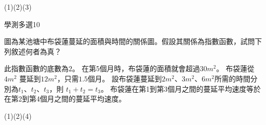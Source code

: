 \begin{QUESTIONS}
\begin{QUESTION}
        \begin{QFROMS}
        \end{QFROMS}
        \begin{QTAGS}\end{QTAGS}
        \begin{QANS}
            (1)(2)(3)
        \end{QANS}
        \begin{QSOLLIST}
        \end{QSOLLIST}
        \begin{QEMPTYSPACE}
        \end{QEMPTYSPACE}
    \end{QUESTION}
    \begin{QUESTION}
        \begin{ExamInfo}{87}{學測}{多選}{10}
        \end{ExamInfo}
        \begin{ExamAnsRateInfo}{}{}{}{}
        \end{ExamAnsRateInfo}
        \begin{QBODY}
            圖為某池塘中布袋蓮蔓延的面積與時間的關係圖。假設其關係為指數函數，試問下列敘述何者為真？
            \begin{QOPS}
                \QOP 此指數函數的底數為$2$。
                \QOP 在第5個月時，布袋蓮的面積就會超過$30m^2$。
                \QOP 布袋蓮從$4m^2$ 蔓延到$12m^2$，只需$1.5$個月。
                \QOP 設布袋蓮蔓延到$2m^2$、$3m^2$、$6m^2$所需的時間分別為$t_1$、$t_2$、$t_3$，則 $t_1+t_2=t_3$。
                \QOP 布袋蓮在第1到第3個月之間的蔓延平均速度等於在第2到第4個月之間的蔓延平均速度。
            \end{QOPS}
        \end{QBODY}
        \begin{QFROMS}
        \end{QFROMS}
        \begin{QTAGS}\end{QTAGS}
        \begin{QANS}
            (1)(2)(4)
        \end{QANS}
        \begin{QSOLLIST}
        \end{QSOLLIST}
        \begin{QEMPTYSPACE}
        \end{QEMPTYSPACE}
    \end{QUESTION}
\end{QUESTIONS}
